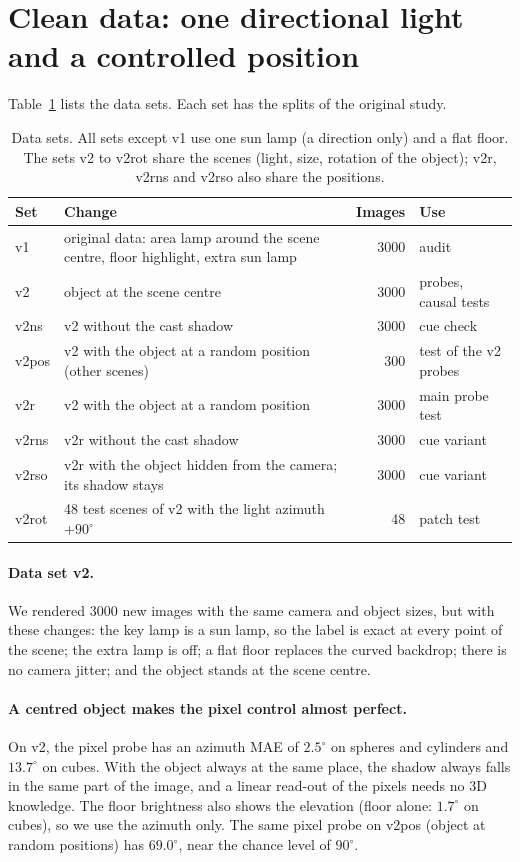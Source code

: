 \documentclass[10pt]{article}
\newcommand{\degr}{^\circ}
\begin{document}
\section{Clean data: one directional light and a controlled position}
\label{sec:clean}

Table~\ref{tab:sets} lists the data sets. Each set has the splits of the original study.

\begin{table}[t]
\centering
\caption{Data sets. All sets except v1 use one sun lamp (a direction only) and a flat floor. The sets v2 to v2rot share the scenes (light, size, rotation of the object); v2r, v2rns and v2rso also share the positions.}
\label{tab:sets}
\begin{tabular}{lp{8.2cm}rl}
\toprule
Set & Change & Images & Use \\
\midrule
v1 & original data: area lamp around the scene centre, floor highlight, extra sun lamp & 3000 & audit \\
v2 & object at the scene centre & 3000 & probes, causal tests \\
v2ns & v2 without the cast shadow & 3000 & cue check \\
v2pos & v2 with the object at a random position (other scenes) & 300 & test of the v2 probes \\
v2r & v2 with the object at a random position & 3000 & main probe test \\
v2rns & v2r without the cast shadow & 3000 & cue variant \\
v2rso & v2r with the object hidden from the camera; its shadow stays & 3000 & cue variant \\
v2rot & 48 test scenes of v2 with the light azimuth $+90\degr$ & 48 & patch test \\
\bottomrule
\end{tabular}
\end{table}

\paragraph{Data set v2.}
We rendered 3000 new images with the same camera and object sizes, but with these changes: the key lamp is a sun lamp, so the label is exact at every point of the scene; the extra lamp is off; a flat floor replaces the curved backdrop; there is no camera jitter; and the object stands at the scene centre.

\paragraph{A centred object makes the pixel control almost perfect.}
On v2, the pixel probe has an azimuth MAE of $2.5\degr$ on spheres and cylinders and $13.7\degr$ on cubes.
With the object always at the same place, the shadow always falls in the same part of the image, and a linear read-out of the pixels needs no 3D knowledge.
The floor brightness also shows the elevation (floor alone: $1.7\degr$ on cubes), so we use the azimuth only.
The same pixel probe on v2pos (object at random positions) has $69.0\degr$, near the chance level of $90\degr$.
\end{document}
